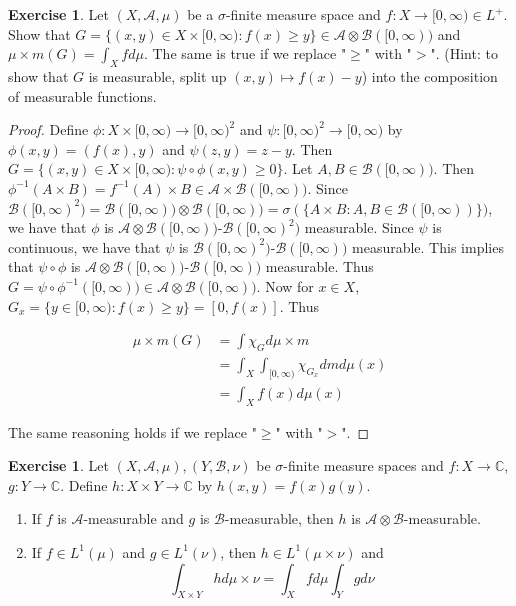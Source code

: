 \documentclass[12pt]{amsart}
\theoremstyle{definition}
\newtheorem{ex}[definition]{Exercise}
\newcommand{\sig}{\sigma}
\newcommand{\C}{\mathbb{C}}
\newcommand{\MA}{\mathcal{A}}
\newcommand{\MB}{\mathcal{B}}
\newcommand{\Rg}{[0,\infty)}
\begin{document}
	\begin{ex}
		Let $(X, \MA, \mu)$ be a $\sig$-finite measure space and $f:X \rightarrow \Rg \in L^+$. Show that $G = \{(x,y) \in X \times \Rg: f(x) \geq y\} \in \MA \otimes \MB(\Rg)$ and $\mu \times m (G) = \int_X f d \mu$. The same is true if we replace "$\geq$" with "$>$". (Hint: to show that $G$ is measurable, split up $(x,y) \mapsto f(x) - y$) into the composition of measurable functions. 
	\end{ex}
	
	\begin{proof}
		Define $\phi: X \times \Rg \rightarrow \Rg^2$ and $\psi: \Rg^2 \rightarrow \Rg$ by $\phi(x,y) = (f(x),y)$ and $\psi(z,y) = z-y$. Then $G = \{(x,y) \in X \times \Rg: \psi \circ \phi(x,y) \geq 0\}$. Let $A, B \in \MB(\Rg)$. Then $\phi^{-1}(A \times B) = f^{-1}(A) \times B \in \MA \times \MB(\Rg)$. Since $\MB(\Rg^2) = \MB(\Rg) \otimes \MB(\Rg) = \sig(\{A \times B: A, B \in \MB(\Rg)\})$, we have that $\phi$ is $\MA \otimes \MB(\Rg)$-$\MB(\Rg^2)$ measurable. Since $\psi$ is continuous, we have that $\psi$ is $\MB(\Rg^2)$-$\MB(\Rg)$ measurable. This implies that $\psi \circ \phi$ is $\MA \otimes \MB(\Rg)$-$\MB(\Rg)$ measurable. Thus $G = \psi \circ \phi^{-1}(\Rg) \in \MA \otimes \MB(\Rg)$. Now for $x \in X$, $G_x = \{y \in \Rg: f(x) \geq y\} = [0, f(x)]$. Thus 
		
		\begin{align*}
			\mu \times m(G) 
			&= \int \chi_G d\mu \times m\\
			&= \int_X \int_{\Rg} \chi_{G_x} dm d\mu(x)\\
			&= \int_X f(x) d\mu(x) 
		\end{align*}
		
		The same reasoning holds if we replace "$\geq$" with "$>$".
	\end{proof}
	
	\begin{ex}
		Let $(X, \MA, \mu), (Y, \MB, \nu)$ be $\sig$-finite measure spaces and $f:X \rightarrow \C$, $g:Y \rightarrow \C$. Define $h:X \times Y \rightarrow \C$ by $h(x,y) = f(x)g(y)$.
		
		\begin{enumerate}
			\item If $f$ is $\MA$-measurable and $g$ is $\MB$-measurable, then $h$ is $\MA \otimes \MB$-measurable.
			
			\item If $f \in L^1(\mu)$ and $g \in L^1(\nu)$, then $h \in L^1(\mu \times \nu)$ and $$\int_{X \times Y}hd \mu \times \nu = \int_X f d\mu \int_Y g d\nu$$
		\end{enumerate}
	\end{ex}
	
\end{document}

